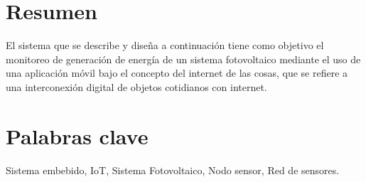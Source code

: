 \section{Resumen}
El sistema que se describe y diseña a continuación tiene como objetivo el monitoreo de generación de energía de un sistema fotovoltaico mediante el uso de una aplicación móvil bajo el concepto del internet de las cosas, que se refiere a una interconexión digital de objetos cotidianos con internet.

\section{Palabras clave}
Sistema embebido, IoT, Sistema Fotovoltaico, Nodo sensor, Red de sensores.

